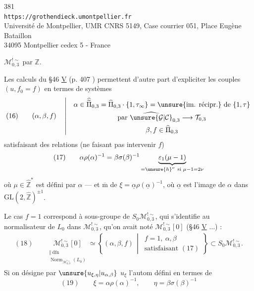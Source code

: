 \begin{center}
381\\
\texttt{https://grothendieck.umontpellier.fr}\\
Université de Montpellier, UMR CNRS 5149, Case courrier 051, Place Eugène Bataillon\\
34095 Montpellier cedex 5 - France
\end{center}

$\mathcal M_{0,3}^{!\sim}$ par $\widehat{\mathbb Z}$.

Les calculs du \S 46 \uline{V} (p. 407 ) permettent d'autre part d'expliciter les couples $(u,f_0=f)$ en termes de systèmes
\[
(16)\qquad
(\alpha,\beta,f)\quad\left|\quad
\begin{gathered}
\alpha\in\widehat{\widetilde{\Pi}}_{0,3}
 =\widehat{\Pi}_{0,3}\cdot\{1,\tau_\infty\}
 =\text{\unsure{im. récipr.} de }\{1,\tau\}\\
\text{par }\widehat{\unsure{\mathcal G|\mathcal C}}_{0,3}\longrightarrow\mathcal T_{0,3}\\
\beta,f\in\widehat{\Pi}_{0,3}
\end{gathered}\right.
\]
satisfaisant des relations (ne faisant pas intervenir $f$)
\[
(17)\qquad
\alpha\rho(\alpha)^{-1}
 =\beta\sigma(\beta)^{-1}
 \underbrace{\varepsilon_1(\mu-1)}_{=\unsure{h}^{\nu}\ \text{si }\mu-1=2\nu}
\]
où $\mu\in\widehat{\mathbb Z}^{*}$ est défini   par $\alpha$ --- et $\overline{\mathrm m}$   de $\xi=\underline\alpha\rho(\underline\alpha)^{-1}$, où $\underline\alpha$ est l'image de $\alpha$ dans $\mathrm{GL}(2,\widehat{\mathbb Z})^{\pm1}$.

Le cas $f=1$ correspond à  sous-groupe de $S_0\mathcal M_{0,3}^{!\sim}$, qui s'identifie au normalisateur de $L_0$ dans $\mathcal M_{0,3}^{!\sim}$, qu'on avait noté $\mathcal M_{0,3}^{!\sim}[0]$ (\S 46 \uline{V} $\ldots$) :
\[
\begin{gathered}
(18)\qquad
\underset{\substack{\Vert\ \mathrm{dfn}\\
\operatorname{Norm}_{\mathcal M_{0,3}^{!\sim}}(L_0)}}{\mathcal M_{0,3}^{!\sim}[0]}
\simeq
\left\{(\alpha,\beta,f)\,\middle|\,
\begin{array}{l}f=1,\ \alpha,\beta\\\text{satisfaisant }(17)\end{array}\right\}
\subset S_0\mathcal M_{0,3}^{!\sim} .
\end{gathered}
\]
Si on désigne par $\unsure{u_{\xi,\eta}|u_{\alpha,\beta}}$    $u_\xi$ l'autom défini en termes de
\[
(19)\qquad
\xi=\alpha\rho(\alpha)^{-1},\qquad
\eta=\beta\sigma(\beta)^{-1}
\]

